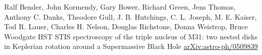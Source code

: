 \documentclass[aspectratio=169]{beamer}
\begin{document}
\begin{frame}[allowframebreaks]
{\begin{thebibliography}{99}
Ralf Bender, John Kormendy, Gary Bower, Richard Green, Jens Thomas, Anthony C. Danks, Theodore Gull, J. B. Hutchings, C. L. Joseph, M. E. Kaiser, Tod R. Lauer, Charles H. Nelson, Douglas Richstone, Donna Weistrop, Bruce Woodgate
\newblock HST STIS spectroscopy of the triple nucleus of M31: two nested disks in Keplerian rotation around a Supermassive Black Hole
\newblock \href{http://arxiv.org/abs/astro-ph/0509839}{arXiv:astro-ph/0509839}

\end{thebibliography}
}
\end{frame}
\end{document}
